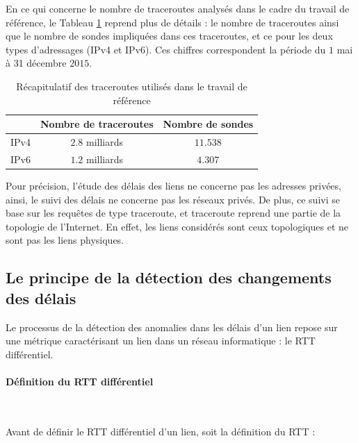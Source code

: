En ce qui concerne le nombre de  traceroutes analysés dans le cadre du travail de référence, le Tableau \ref{tab:dataset} reprend plus de détails : le nombre de traceroutes ainsi que le nombre de sondes impliquées dans ces traceroutes, et ce pour les deux types d'adressages (IPv4 et IPv6).  Ces chiffres correspondent la période du $1$ mai à 31 décembre $2015$.


\begin{table}[H]
	\centering
	\begin{tabular}{c c c}
		\hline
		& \textbf{Nombre de traceroutes}& \textbf{Nombre de sondes}\\ \hline
		IPv4		&$ 2.8 $ milliards & $ 11.538 $\\ \hline
		IPv6	&	$ 1.2 $ milliards & $ 4.307 $ \\ \hline
	\end{tabular}
	\caption{Récapitulatif des traceroutes utilisés dans le travail de référence }
	\label{tab:dataset}
\end{table}


Pour précision, l'étude des délais des liens ne concerne pas  les adresses privées, ainsi, le suivi des délais ne concerne pas les réseaux privés.  De plus, ce  suivi  se base sur les requêtes de type traceroute, et traceroute reprend une partie de la topologie de l'Internet. En effet, les liens considérés sont ceux topologiques et ne sont pas  les liens physiques. 

\subsection{Le principe de la détection des changements des délais} \label{principe-de-detection}

Le processus de la détection des anomalies dans les délais d'un lien repose sur une métrique caractérisant un lien dans un réseau informatique : le RTT différentiel.
\paragraph{Définition du RTT différentiel }~

Avant de définir le RTT différentiel d'un lien, soit la définition du RTT :


